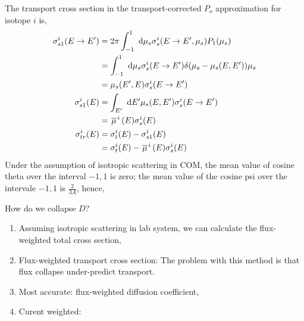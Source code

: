 \documentclass{school-22.211-notes}
\begin{document}
The transport cross section in the transport-corrected $P_o$ approximation for isotope $i$ is, 
\begin{align}
\sigma_{s1}^i (E\to E') &= 2 \pi \int_{-1}^1 \mbox{ }\mathrm{d} \mu_s \sigma_s^i (E\to E', \mu_s) P_1 (\mu_s) \\
&= \int_{-1}^1 \mbox{ }\mathrm{d} \mu_s \sigma_s^i (E \to E') \delta(\mu_s - \mu_s(E,E')) \mu_s \\
&= \mu_s (E', E) \sigma_s^i (E \to E') \\
\sigma_{s1}^i (E) &= \int_{E'} \mbox{ }\mathrm{d} E' \mu_s(E,E') \sigma_s^i (E\to E') \\
&= \left.\overline{\mu} \right.^i (E) \sigma_s^i (E) \\
\sigma_{tr}^i (E) &= \sigma_t^i (E)  - \sigma_{s1}^i (E)  \\
&= \sigma_t^i (E) - \left.\overline{\mu} \right.^i (E) \sigma_s^i (E)
\end{align}
Under the assumption of isotropic scattering in COM, the mean value of cosine theta over the interval $-1,1$ is zero; the mean value of the cosine psi over the intervale $-1,1$ is $\frac{2}{3A}$, hence,

How do we collapse $D$? 
\begin{enumerate}
\item Assuming isotropic scattering in lab system, we can calculate the flux-weighted total cross section,
\item Flux-weighted transport cross section: 
The problem with this method is that flux collapse under-predict transport. 
\item Most accurate: flux-weighted diffusion coefficient,
\item Curent weighted: 

\end{enumerate}
\end{document}
